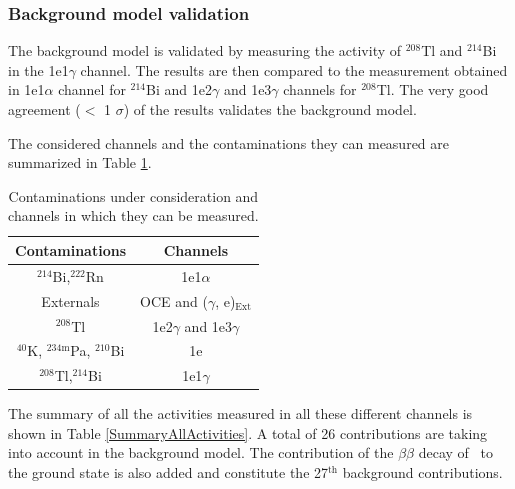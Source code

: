 \documentclass[main.tex]{subfiles}
\begin{document}
\subsubsection{Background model validation}


\NI The background model is validated by measuring the activity of $^{\text{208}}$Tl and $^{\text{214}}$Bi in the 1e1$\gamma$ channel. The results are then compared to the measurement obtained in 1e1$\alpha$ channel for $^{\text{214}}$Bi and 1e2$\gamma$ and  1e3$\gamma$ channels for $^{\text{208}}$Tl. The very good agreement ($<$ 1 $\sigma$) of the results validates the background model.




The considered channels and the contaminations they can measured are summarized in Table \ref{TableChannelBKG}.  



\begin{table}[h!]
\centering
\begin{tabular}{c|c}
\toprule
Contaminations & Channels \\[0.1cm]
\midrule
$^{\text{214}}$Bi,$^{\text{222}}$Rn                    & 1e1$\alpha$                           \\[0.1cm]  
Externals                                              & OCE and ($\gamma$, e)$_{\text{Ext}}$  \\[0.1cm]
$^{\text{208}}$Tl                                      & 1e2$\gamma$  and 1e3$\gamma$          \\[0.1cm]
$^{\text{40}}$K, $^{\text{234m}}$Pa, $^{\text{210}}$Bi & 1e                                    \\[0.1cm]
$^{\text{208}}$Tl,$^{\text{214}}$Bi                    & 1e1$\gamma$                           \\[0.1cm] 
\bottomrule
\end{tabular}
\caption{Contaminations under consideration and channels in which they can be measured.}
\label{TableChannelBKG}
\end{table}




\NI The summary of all the activities measured in all these different channels is shown in Table \ref{SummaryAllActivities}. A total of 26 contributions are taking into account in the background model. The contribution of the $\beta \beta$ decay of \Cd~to the ground state is also added and constitute the 27$^{\text{th}}$ background contributions.
\end{document}
